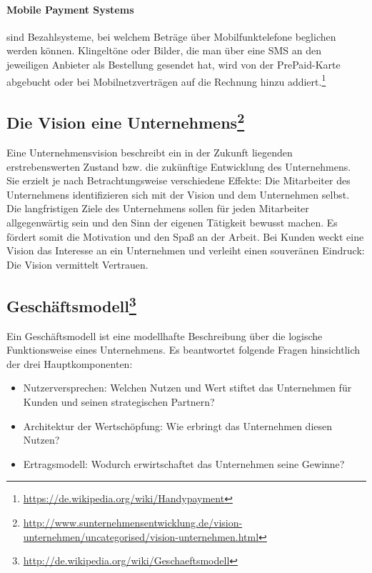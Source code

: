 \paragraph{Mobile Payment Systems} sind Bezahlsysteme, bei welchem Beträge über Mobilfunktelefone beglichen werden können. Klingeltöne oder Bilder, die man über eine SMS an den jeweiligen Anbieter als Bestellung gesendet hat, wird von der PrePaid-Karte abgebucht oder bei Mobilnetzverträgen auf die Rechnung hinzu addiert.\footnote{\url{ https://de.wikipedia.org/wiki/Handypayment}}



\subsection[Die Vision eines Unternehmens]{Die Vision eine Unternehmens\footnote{\url{ http://www.sunternehmensentwicklung.de/vision-unternehmen/uncategorised/vision-unternehmen.html}}}

Eine Unternehmensvision beschreibt ein in der Zukunft liegenden erstrebens\-werten Zustand bzw. die zukünftige Entwicklung des Unternehmens. Sie erzielt je nach Betrachtungsweise verschiedene Effekte: Die Mitarbeiter des Unternehmens identifizieren sich mit der Vision und dem Unternehmen selbst. Die langfristigen Ziele des Unternehmens sollen für jeden Mitarbeiter allgegenwärtig sein und den Sinn der eigenen Tätigkeit bewusst machen. Es fördert somit die Motivation und den Spaß an der Arbeit. Bei Kunden weckt eine Vision das Interesse an ein Unternehmen und verleiht einen souveränen Eindruck: Die Vision vermittelt Vertrauen.
 

\subsection[Geschäftsmodell]{Geschäftsmodell\footnote{\url{ http://de.wikipedia.org/wiki/Geschaeftsmodell}}}

Ein Geschäftsmodell ist eine modellhafte Beschreibung über die logische Funktionsweise eines Unternehmens. Es beantwortet folgende Fragen hinsichtlich der drei Hauptkomponenten:
\begin{itemize}
	\item Nutzerversprechen: Welchen Nutzen und Wert stiftet das Unternehmen für Kunden und seinen strategischen Partnern?
	\item Architektur der Wertschöpfung: Wie erbringt das Unternehmen diesen Nutzen?
	\item Ertragsmodell: Wodurch erwirtschaftet das Unternehmen seine Ge\-winne?
\end{itemize}

